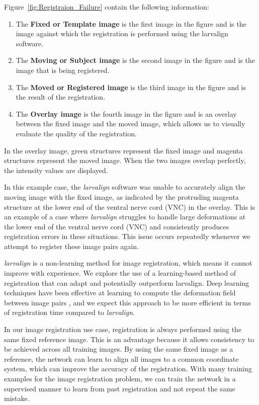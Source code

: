 \documentclass{book}
\begin{document}
	Figure~\ref{fig:Registraion_Failure} contain the following information: 
	\begin{enumerate}
		\item The \textbf{Fixed or Template image} is the first image in the figure and is the image against which the registration is performed using the larvalign software.
		\item The \textbf{Moving or Subject image} is the second image in the figure and is the image that is being registered.
		\item The \textbf{Moved or Registered image} is the third image in the figure and is the result of the registration.
		\item The \textbf{Overlay image} is the fourth image in the figure and is an overlay between the fixed image and the moved image, which allows us to visually evaluate the quality of the registration.
	\end{enumerate}
	
	In the overlay image, green structures represent the fixed image and magenta structures represent the moved image. When the two images overlap perfectly, the intensity values are displayed.
	
	In this example case, the \textit{larvalign} software was unable to accurately align the moving image with the fixed image, as indicated by the protruding magenta structure at the lower end of the ventral nerve cord (VNC) in the overlay. This is an example of a case where \textit{larvalign} struggles to handle large deformations at the lower end of the ventral nerve cord (VNC) and consistently produces registration errors in these situations. This issue occurs repeatedly whenever we attempt to register these image pairs again.
	
	\textit{larvalign} is a non-learning method for image registration, which means it cannot improve with experience. We explore the use of a learning-based method of registration that can adapt and potentially outperform larvalign. Deep learning techniques have been effective at learning to compute the deformation field between image pairs \cite{Balakrishnan_2019, de_Vos_2019, Wu, Fu_2020, 10.1007/978-3-319-66182-7_27}, and we expect this approach to be more efficient in terms of registration time compared to \textit{larvalign}.
	
	In our image registration use case, registration is always performed using the same fixed reference image. This is an advantage because it allows consistency to be achieved across all training images. By using the same fixed image as a reference, the network can learn to align all images to a common coordinate system, which can improve the accuracy of the registration. With many training examples for the image registration problem, we can train the network in a supervised manner to learn from past registration and not repeat the same mistake.
	
\end{document}

